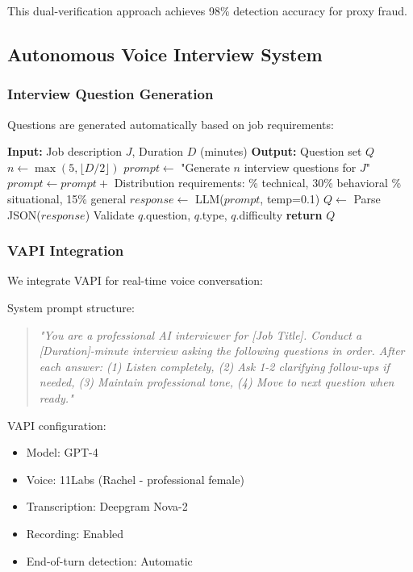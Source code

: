 \documentclass[conference]{IEEEtran}
\begin{document}
This dual-verification approach achieves 98\% detection accuracy for proxy fraud.

\subsection{Autonomous Voice Interview System}

\subsubsection{Interview Question Generation}

Questions are generated automatically based on job requirements:

\begin{algorithm}[h]
\caption{AI Question Generation}
\label{alg:question_gen}
\begin{algorithmic}[1]
\STATE \textbf{Input:} Job description $J$, Duration $D$ (minutes)
\STATE \textbf{Output:} Question set $Q$
\STATE
\STATE $n \leftarrow \max(5, \lfloor D / 2 \rfloor)$ 
\STATE $prompt \leftarrow$ "Generate $n$ interview questions for $J$"
\STATE $prompt \leftarrow prompt +$ Distribution requirements:
\STATE {}\% technical, 30\% behavioral
\STATE {}\% situational, 15\% general
\STATE $response \leftarrow$ LLM($prompt$, temp=0.1)
\STATE $Q \leftarrow$ Parse JSON($response$)
    \STATE Validate $q$.question, $q$.type, $q$.difficulty
\ENDFOR
\STATE \textbf{return} $Q$
\end{algorithmic}
\end{algorithm}

\subsubsection{VAPI Integration}

We integrate VAPI for real-time voice conversation:

System prompt structure:
\begin{quote}
\textit{"You are a professional AI interviewer for [Job Title]. Conduct a [Duration]-minute interview asking the following questions in order. After each answer: (1) Listen completely, (2) Ask 1-2 clarifying follow-ups if needed, (3) Maintain professional tone, (4) Move to next question when ready."}
\end{quote}

VAPI configuration:
\begin{itemize}
    \item Model: GPT-4
    \item Voice: 11Labs (Rachel - professional female)
    \item Transcription: Deepgram Nova-2
    \item Recording: Enabled
    \item End-of-turn detection: Automatic
\end{itemize}
\end{document}
